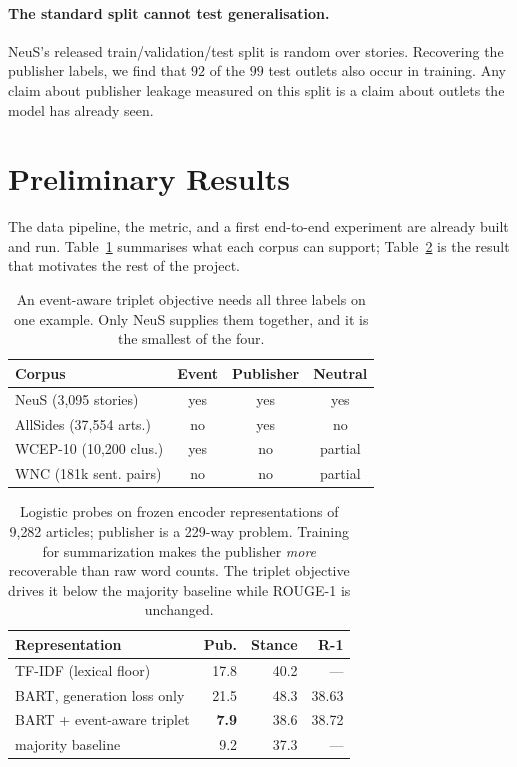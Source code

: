 \documentclass[10pt,twocolumn,a4paper]{article}
\begin{document}
\paragraph{The standard split cannot test generalisation.}
NeuS's released train/validation/test split is random over stories. Recovering
the publisher labels, we find that $92$ of the $99$ test outlets also occur in
training. Any claim about publisher leakage measured on this split is a claim
about outlets the model has already seen.

\section{Preliminary Results}

The data pipeline, the metric, and a first end-to-end experiment are already
built and run. Table~\ref{tab:corpora} summarises what each corpus can support;
Table~\ref{tab:probe} is the result that motivates the rest of the project.

\begin{table}[t]
\centering\small
\setlength{\tabcolsep}{3.5pt}
\begin{tabular}{@{}lccc@{}}
\toprule
\textbf{Corpus} & \textbf{Event} & \textbf{Publisher} & \textbf{Neutral} \\
\midrule
NeuS (3{,}095 stories)     & yes & yes & yes \\
AllSides (37{,}554 arts.)  & no  & yes & no  \\
WCEP-10 (10{,}200 clus.)   & yes & no  & partial \\
WNC (181k sent. pairs)     & no  & no  & partial \\
\bottomrule
\end{tabular}
\caption{An event-aware triplet objective needs all three labels on one example.
Only NeuS supplies them together, and it is the smallest of the four.}
\label{tab:corpora}
\end{table}

\begin{table}[t]
\centering\small
\setlength{\tabcolsep}{3pt}
\begin{tabular}{@{}lrrr@{}}
\toprule
\textbf{Representation} & \textbf{Pub.} & \textbf{Stance} & \textbf{R-1} \\
\midrule
TF-IDF (lexical floor)      & 17.8 & 40.2 & --- \\
BART, generation loss only  & 21.5 & 48.3 & 38.63 \\
BART + event-aware triplet  & \textbf{7.9} & 38.6 & 38.72 \\
\midrule
majority baseline           & 9.2  & 37.3 & --- \\
\bottomrule
\end{tabular}
\caption{Logistic probes on frozen encoder representations of 9{,}282 articles;
publisher is a 229-way problem. Training for summarization makes the publisher
\emph{more} recoverable than raw word counts. The triplet objective drives it
below the majority baseline while ROUGE-1 is unchanged.}
\label{tab:probe}
\end{table}
\end{document}
